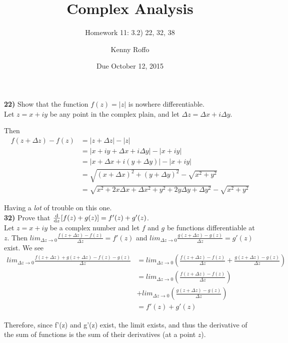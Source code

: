 \documentclass{scrartcl}
\title{Complex Analysis}
\subtitle{Homework 11: 3.2) 22, 32, 38}
\author{Kenny Roffo}
\date{Due October 12, 2015}
\begin{document}
\maketitle

\textbf{22)} Show that the function $f(z)=|z|$ is nowhere differentiable.\\

Let $z=x+iy$ be any point in the complex plain, and let $\Delta z = \Delta x + i \Delta y$.

Then 
\begin{align*}
f(z+\Delta z) - f(z) &= |z + \Delta z| - |z|\\
                     &= |x + iy + \Delta x + i \Delta y| - |x + iy|\\
                     &= |x + \Delta x + i(y + \Delta y)| - |x + iy|\\
                     &= \sqrt{(x+\Delta x)^2 + (y+\Delta y)^2} - \sqrt{x^2 + y^2}\\
                     &= \sqrt{x^2 + 2x\Delta x + \Delta x^2 + y^2 + 2y\Delta y + \Delta y^2} - \sqrt{x^2 + y^2}
\end{align*}
 
Having a \emph{lot} of trouble on this one.\\

\textbf{32)} Prove that $\od{}{z}[f(z) + g(z)] = f'(z) + g'(z)$.\\

Let $z=x+iy$ be a complex number and let $f$ and $g$ be functions differentiable at $z$. Then $lim_{\Delta z \rightarrow 0}\frac{f(z + \Delta z) - f(z)}{\Delta z} = f'(z)$ and $lim_{\Delta z \rightarrow 0}\frac{g(z + \Delta z) - g(z)}{\Delta z} = g'(z)$ exist. We see
\begin{align*}
  lim_{\Delta z \rightarrow 0}\frac{f(z + \Delta z) + g(z + \Delta z) - f(z) - g(z)}{\Delta z} &= lim_{\Delta z \rightarrow 0}\left(\frac{f(z + \Delta z) - f(z)}{\Delta z} + \frac{g(z + \Delta z) - g(z)}{\Delta z}\right)\\
  &= lim_{\Delta z \rightarrow 0}\left(\frac{f(z + \Delta z) - f(z)}{\Delta z}\right)\\
  &+ lim_{\Delta z \rightarrow 0}\left(\frac{g(z + \Delta z) - g(z)}{\Delta z}\right)\\
  &= f'(z) + g'(z)
\end{align*} 

Therefore, since f'(z) and g'(z) exist, the limit exists, and thus the derivative of the sum of functions is the sum of their derivatives (at a point $z$).\\
\end{document}
